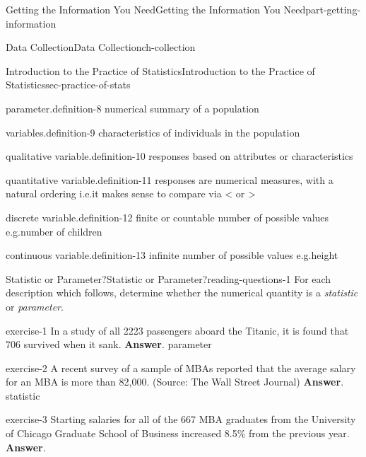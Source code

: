 \documentclass[oneside,10pt,]{book}
\numberwithin{equation}{section}
\begin{document}
\begin{partptx}{Getting the Information You Need}{}{Getting the Information You Need}{}{}{part-getting-information}
\begin{chapterptx}{Data Collection}{}{Data Collection}{}{}{ch-collection}
\begin{sectionptx}{Introduction to the Practice of Statistics}{}{Introduction to the Practice of Statistics}{}{}{sec-practice-of-stats}
\begin{definition}{parameter.}{definition-8}
numerical summary of a population\end{definition}
\begin{definition}{variables.}{definition-9}%
characteristics of individuals in the population\end{definition}
\begin{definition}{qualitative variable.}{definition-10}%
responses based on attributes or characteristics\end{definition}
\begin{definition}{quantitative variable.}{definition-11}%
responses are numerical measures, with a natural ordering i.e.\@ it makes sense to compare via \textless{} or \textgreater{}\end{definition}
\begin{definition}{discrete variable.}{definition-12}%
finite or countable number of possible values e.g.\@ number of children\end{definition}
\begin{definition}{continuous variable.}{definition-13}%
infinite number of possible values e.g.\@ height\end{definition}
%
%
\typeout{************************************************}
\typeout{************************************************}
%
\begin{reading-questions-subsection-numberless}{Statistic or Parameter?}{}{Statistic or Parameter?}{}{}{reading-questions-1}
\hypertarget{p-3}{}%
For each description which follows, determine whether the numerical quantity is a \emph{statistic} or \emph{parameter}.%
\begin{divisionexercise}{1}{}{}{exercise-1}%
In a study of all 2223 passengers aboard the Titanic, it is found that 706 survived when it sank. \textbf{Answer}.\hypertarget{answer-1}{}\quad%
parameter\end{divisionexercise}%
\begin{divisionexercise}{2}{}{}{exercise-2}%
A recent survey of a sample of MBAs reported that the average salary for an MBA is more than \textdollar{}82,000. (Source: The Wall Street Journal) \textbf{Answer}.\hypertarget{answer-2}{}\quad%
statistic\end{divisionexercise}%
\begin{divisionexercise}{3}{}{}{exercise-3}%
Starting salaries for all of the 667 MBA graduates from the University of Chicago Graduate School of Business increased 8.5\% from the previous year. \textbf{Answer}.\hypertarget{answer-3}{}\quad%

\end{divisionexercise}
\end{reading-questions-subsection-numberless}
\end{sectionptx}
\end{chapterptx}
\end{partptx}
\end{document}
